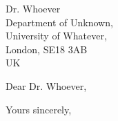\documentclass[letter]{letter}
\begin{document}
\pagestyle{firstpage}
\begin{letter}{Dr. Whoever\\Department of Unknown,\\University of Whatever,\\London, SE18 3AB\\UK}

  \address{Immanuel Kant <Dr.>\\
    K\"{o}nigsberg, Prussia\\
    German}
  \signature{Immanuel Kant}
  \date{\today}

  \opening{Dear Dr. Whoever,}
  \kant[1]
  \closing{Yours sincerely,}
\end{letter}
\end{document}

